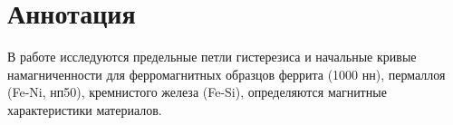 \section*{Аннотация}

В работе исследуются предельные петли гистерезиса и начальные кривые намагниченности для ферромагнитных образцов феррита (1000 нн), пермаллоя (Fe-Ni, нп50), кремнистого железа (Fe-Si), определяются магнитные характеристики материалов.